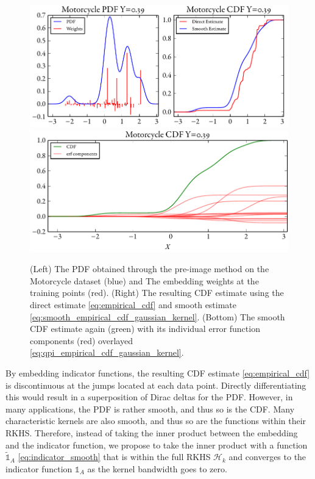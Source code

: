 \documentclass[twoside]{article} \usepackage{aistats2017}
\theoremstyle{definition}
\theoremstyle{theorem}
\begin{document}
		\begin{figure}
			\begin{center}
				\includegraphics[width=\columnwidth]{figures/cumulativeexamplesmooth}
				\includegraphics[width=\columnwidth]{figures/cumulativeexampleerf}
			\end{center}
			\caption{\small (Left) The PDF obtained through the pre-image method on the Motorcycle dataset (blue) and The embedding weights at the training points (red). (Right) The resulting CDF estimate using the direct estimate \eqref{eq:empirical_cdf} and smooth estimate \eqref{eq:smooth_empirical_cdf_gaussian_kernel}. (Bottom) The smooth CDF estimate again (green) with its individual error function components (red) overlayed \eqref{eq:qpi_empirical_cdf_gaussian_kernel}.}
			\label{fig:direct_quantile_regression}
		\end{figure}
		
		By embedding indicator functions, the resulting CDF estimate \eqref{eq:empirical_cdf} is discontinuous at the jumps located at each data point. Directly differentiating this would result in a superposition of Dirac deltas for the PDF. However, in many applications, the PDF is rather smooth, and thus so is the CDF. Many characteristic kernels are also smooth, and thus so are the functions within their RKHS. Therefore, instead of taking the inner product between the embedding and the indicator function, we propose to take the inner product with a function $\tilde{\mathbb{1}}_{A}$ \eqref{eq:indicator_smooth} that is within the full RKHS $\mathcal{H}_{k}$ and converges to the indicator function $\mathbb{1}_{A}$ as the kernel bandwidth goes to zero.
		
\end{document}
